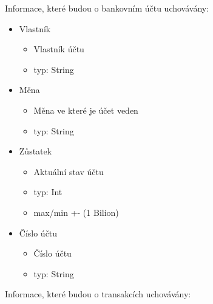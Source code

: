 \documentclass[FM,SP]{tulthesis}
\begin{document}
Informace, které budou o bankovním účtu uchovávány:
\begin{itemize}
    \item Vlastník
          \begin{itemize}
              \item Vlastník účtu
              \item typ: String
          \end{itemize}
    \item Měna
          \begin{itemize}
              \item Měna ve které je účet veden
              \item typ: String
          \end{itemize}
          \clearpage %
    \item Zůstatek
          \begin{itemize}
              \item Aktuální stav účtu
              \item typ: Int
              \item max/min +- (1 Bilion)
          \end{itemize}
    \item Číslo účtu
        \begin{itemize}
            \item Číslo účtu
            \item typ: String
        \end{itemize}
\end{itemize}
Informace, které budou o transakcích uchovávány:
\end{document}

